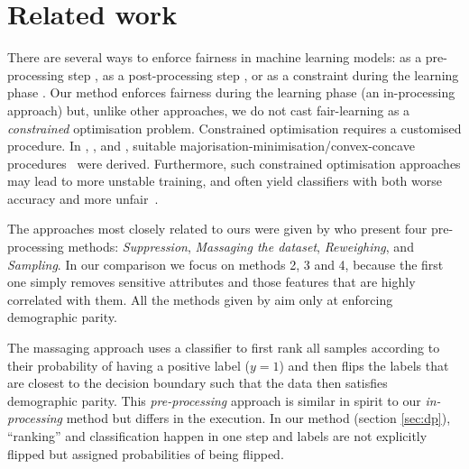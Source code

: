 \section{Related work}\label{sec:relatedwork}
There are several ways to enforce fairness in machine learning models:
as a pre-processing step
\citep{kamiran2012data,louizos2016variational,lum2016statistical,zemel2013learning,Chiappa19,QuaShaTho19},
as a post-processing step \citep{feldman2015certifying,hardt2016equality}, %
 or as a constraint during the learning phase
\citep{calders2009building,zafar2017fairnesstreatment,zafar2017fairnessconstraints,DonOneBenShaetal18,DimLiuParRad19}.
%
Our method enforces fairness during the learning phase (an in-processing approach) but, unlike other approaches, we do not cast fair-learning as a \emph{constrained} optimisation problem.
Constrained optimisation requires a customised procedure.
%
In \citet{GohCotGupFri16}, \citet{zafar2017fairnessconstraints}, and \citet{zafar2017fairnesstreatment},
suitable majorisation-minimisation/convex-concave procedures~\citep{LanSri09} were derived.
%
Furthermore, such constrained optimisation approaches may lead to more unstable training,
and often yield classifiers with both worse accuracy and more unfair~\citep{CotJiaWanNar18}.

The approaches most closely related to ours were given by \citet{kamiran2012data} who present four pre-processing methods:
\emph{Suppression}, \emph{Massaging the dataset}, \emph{Reweighing}, and \emph{Sampling}.
In our comparison we focus on methods 2, 3 and 4,
because the first one simply removes sensitive attributes and those features that are highly correlated with them.
All the methods given by \citet{kamiran2012data} aim only at enforcing demographic parity.

The massaging approach uses a classifier to first rank all samples according to their probability of having a positive label ($y=1$)
and then flips the labels that are closest to the decision boundary such that the data then satisfies demographic parity.
This \emph{pre-processing} approach is similar in spirit to our \emph{in-processing} method but differs in the execution.
In our method (section \ref{sec:dp}), ``ranking'' and classification happen in one step and labels are not explicitly flipped
but assigned probabilities of being flipped.

